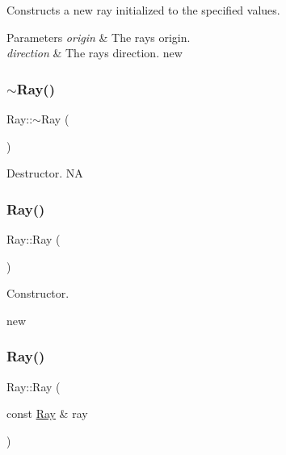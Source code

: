 Constructs a new ray initialized to the specified values.


\begin{DoxyParams}{Parameters}
{\em origin} & The ray\textquotesingle{}s origin. \\
\hline
{\em direction} & The ray\textquotesingle{}s direction.  new \\
\hline
\end{DoxyParams}
\mbox{\label{classRay_a8b0e575ce5df046c0c7615c32a96a46f}} 
\subsubsection{\texorpdfstring{$\sim$\+Ray()}{~Ray()}\hspace{0.1cm}{\footnotesize\ttfamily [1/2]}}
{\footnotesize\ttfamily Ray\+::$\sim$\+Ray (\begin{DoxyParamCaption}{ }\end{DoxyParamCaption})}

Destructor.  NA \mbox{\label{classRay_a2e3d2c29f2df4ab3da10da79d4acb852}} 
\subsubsection{\texorpdfstring{Ray()}{Ray()}\hspace{0.1cm}{\footnotesize\ttfamily [4/6]}}
{\footnotesize\ttfamily Ray\+::\+Ray (\begin{DoxyParamCaption}{ }\end{DoxyParamCaption})}

Constructor.

new \mbox{\label{classRay_a155a0b6573cf6a9a2256eb5062523daf}} 
\subsubsection{\texorpdfstring{Ray()}{Ray()}\hspace{0.1cm}{\footnotesize\ttfamily [5/6]}}
{\footnotesize\ttfamily Ray\+::\+Ray (\begin{DoxyParamCaption}\item[{const \hyperlink{classRay}{Ray} \&}]{ray }\end{DoxyParamCaption})}

